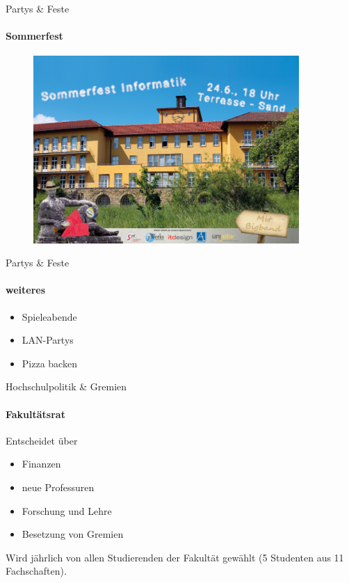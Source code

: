 \documentclass{beamer}
\begin{document}
	\begin{frame}{Partys \& Feste}
		\framesubtitle{Sommerfest}
		\begin{figure}
			\includegraphics[width=0.9\textwidth]{pictures/sommerfest.png}
		\end{figure}
	\end{frame}
	
	\begin{frame}{Partys \& Feste}
		\framesubtitle{weiteres}
		\begin{itemize}
			\item Spieleabende
			\item LAN-Partys
			\item Pizza backen
		\end{itemize}
	\end{frame}
	
	\begin{frame}{Hochschulpolitik \& Gremien}
		\framesubtitle{Fakultätsrat}
	 	Entscheidet über
	 	\begin{itemize}
	 		\item Finanzen
	 		\item neue Professuren
	 		\item Forschung und Lehre
	 		\item Besetzung von Gremien
	 	\end{itemize}
	 	Wird jährlich von allen Studierenden der Fakultät gewählt (5 Studenten aus 11 Fachschaften).
	 \end{frame}
	
\end{document}
